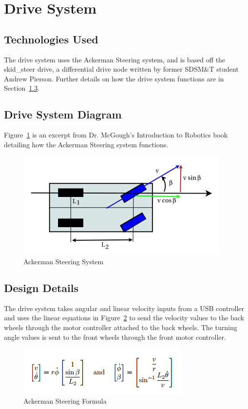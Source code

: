 \section{Drive System }\label{drivesystem}

\subsection{Technologies  Used}
The drive system uses the Ackerman Steering system, and is based off the skid\_steer drive, a differential drive node written by former SDSM\&T student Andrew Pierson. Further details on how the drive system functions are in Section~\ref{drivesystemdesigndetails}.

\subsection{Drive System Diagram}
Figure~\ref{ack_drawing} is an excerpt from Dr. McGough's Introduction to Robotics book detailing how the Ackerman Steering system functions.


\begin{figure}[tbh]
\begin{center}
\includegraphics[width=.5\textwidth]{resources/diagram/ackerman_drawing}
\end{center}
\caption{Ackerman Steering System \label{ack_drawing}}
\end{figure}

\subsection{Design Details}\label{drivesystemdesigndetails}
The drive system takes angular and linear velocity inputs from a USB controller and uses the linear equations in Figure~\ref{ack_equation} to send the velocity values to the back wheels through the motor controller attached to the back wheels. The turning angle values is sent to the front wheels through the front motor controller.

\begin{figure}[tbh]
\begin{center}
\includegraphics[width=.5\textwidth]{resources/diagram/ackerman_equation}
\end{center}
\caption{Ackerman Steering Formula \label{ack_equation}}
\end{figure}

